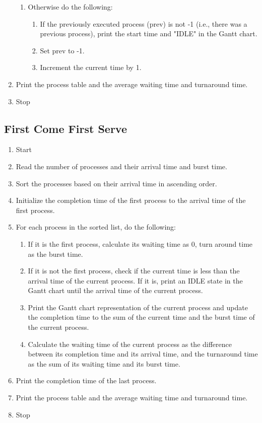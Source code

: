 \begin{enumerate}
\begin{enumerate}
       \item Otherwise do the following:
       \begin{enumerate}
           \item If the previously executed process (prev) is not -1 (i.e., there was a previous process), print the start time and "IDLE" in the Gantt chart.
           \item Set prev to -1.
           \item Increment the current time by 1.
       \end{enumerate}
   \end{enumerate}
   \item Print the process table and the average waiting time and turnaround time.
   \item Stop
\end{enumerate}

\subsection{First Come First Serve}
\begin{enumerate}
   \item Start
   \item Read the number of processes and their arrival time and burst time.
   \item Sort the processes based on their arrival time in ascending order.
   \item Initialize the completion time of the first process to the arrival time of the first process.
   \item For each process in the sorted list, do the following:
   \begin{enumerate}
       \item If it is the first process, calculate its waiting time as 0, turn around time as the burst time.
       \item If it is not the first process, check if the current time is less than the arrival time of the current process. If it is, print an IDLE state in the Gantt chart until the arrival time of the current process.
       \item Print the Gantt chart representation of the current process and update the completion time to the sum of the current time and the burst time of the current process.
       \item Calculate the waiting time of the current process as the difference between its completion time and its arrival time, and the turnaround time as the sum of its waiting time and its burst time.
   \end{enumerate}
   \item Print the completion time of the last process.
   \item Print the process table and the average waiting time and turnaround time.
   \item Stop
\end{enumerate}

